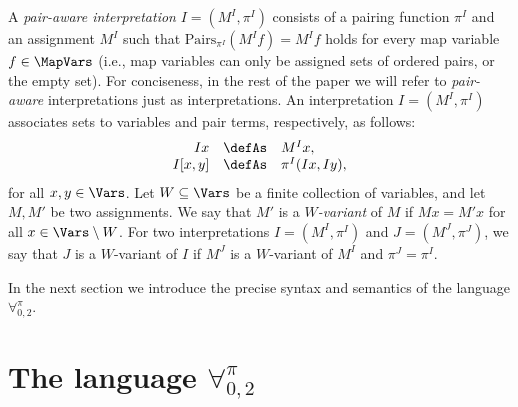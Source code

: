 \documentclass[submission,copyright,creativecommons]{eptcs}
\newcommand{\Lang}{\ensuremath{\mathbf{\forall}^{\pi}_{0,2}}\xspace}
\newcommand{\assignment}[1]{M^{#1}}
\newcommand{\pairf}[1]{\pi^{#1}}
\newcommand{\inter}{I}
\newcommand{\ipairf}{\pairf{\inter}}
\newcommand{\iassignment}{\assignment{\inter}}
\newcommand{\interp}{J}
\newcommand{\ipairfp}{\pairf{\interp}}
\newcommand{\iassignmentp}{\assignment{\interp}}
\newcommand{\pairs}[2]{\mathrm{Pairs}_{\pi^{#1}}(#2)}
\newcommand{\vx}{x}
\newcommand{\vy}{y}
\newcommand{\mvx}{f}
\begin{document}
A \emph{pair-aware interpretation} $\inter=(\iassignment, \ipairf)$
consists of a pairing function $\ipairf$ and an assignment
$\iassignment$ such that
$\pairs{\inter}{\iassignment \mvx}=\iassignment \mvx$ 
holds for every map variable $\mvx \in \MapVars$ (i.e., map variables
can only be assigned sets of ordered pairs, or the empty set).  For
conciseness, in the rest of the paper we will refer to \emph{pair-aware}
interpretations just as interpretations.
An interpretation $\inter=(\iassignment, \ipairf)$ associates sets to
variables and pair terms, respectively, as follows:
\begin{equation}
    \label{interpVarsPairs}
\begin{array}{rcl}
 \inter \vx & \defAs & \iassignment \vx,\\
 \inter [\vx,\vy] & \defAs& \ipairf(\inter \vx, \inter \vy),
\end{array}
\end{equation}
for all $\vx,\vy \in \Vars$. 
Let $W\subseteq\Vars$ be a finite collection of variables, and let
$M,M'$ be two assignments.  We say that $M'$ is a $W$\emph{-variant}
of $M$ if $M x = M' x$ for all $x \in \Vars \setminus W$.  For two
interpretations $\inter = (\iassignment, \ipairf)$ and $\interp =
(\iassignmentp, \ipairfp)$, we say that $\interp$ is a $W$-variant of
$\inter$ if $\iassignmentp$ is a $W$-variant of $\iassignment$ and
$\ipairfp=\ipairf$.

In the next section we introduce the precise syntax and semantics of 
the language \Lang.

\section{The language \Lang}\label{LANG}
\end{document}
